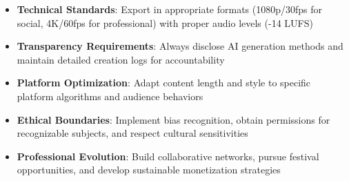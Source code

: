 \begin{itemize}
\item \textbf{Technical Standards}: Export in appropriate formats (1080p/30fps for social, 4K/60fps for professional) with proper audio levels (-14 LUFS)
\item \textbf{Transparency Requirements}: Always disclose AI generation methods and maintain detailed creation logs for accountability
\item \textbf{Platform Optimization}: Adapt content length and style to specific platform algorithms and audience behaviors
\item \textbf{Ethical Boundaries}: Implement bias recognition, obtain permissions for recognizable subjects, and respect cultural sensitivities
\item \textbf{Professional Evolution}: Build collaborative networks, pursue festival opportunities, and develop sustainable monetization strategies
\end{itemize}
